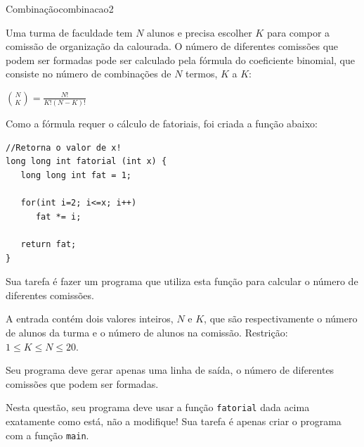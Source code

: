 \documentclass[12pt,a4paper,oneside]{article}
\begin{document}
\begin{problem}{Combinação}{combinacao}{2}
 
Uma turma de faculdade tem $N$ alunos e precisa escolher $K$ para compor a comissão de organização da calourada. O número de diferentes comissões que
podem ser formadas pode ser calculado pela fórmula do coeficiente binomial, que consiste no número de combinações de $N$ termos, $K$ a $K$:

\begin{center}
$\displaystyle \binom{N}{K} = \frac{N!}{K!(N-K)!}$
\end{center}

Como a fórmula requer o cálculo de fatoriais, foi criada a função abaixo:

\begin{lstlisting}
//Retorna o valor de x!
long long int fatorial (int x) {
   long long int fat = 1;
   
   for(int i=2; i<=x; i++)
      fat *= i;
      
   return fat;
}
\end{lstlisting}

Sua tarefa é fazer um programa que utiliza esta função para calcular o número de diferentes comissões.

%

\InputFile

A entrada contém dois valores inteiros, $N$ e $K$, que são respectivamente o número de alunos da turma e o número de alunos na comissão. Restrição: $1 \leq K \leq N \leq 20$.


\OutputFile

Seu programa deve gerar apenas uma linha de saída, o número de
diferentes comissões que podem ser formadas.

\Notes
Nesta questão, seu programa deve usar a função \texttt{fatorial} dada acima exatamente como está, não a modifique! Sua
tarefa é apenas criar o programa com a função \texttt{main}.

\Example

\begin{example}
%
\end{example}

\begin{example}
%
\end{example}

\begin{example}
%
\end{example}



\end{problem}
\end{document}
